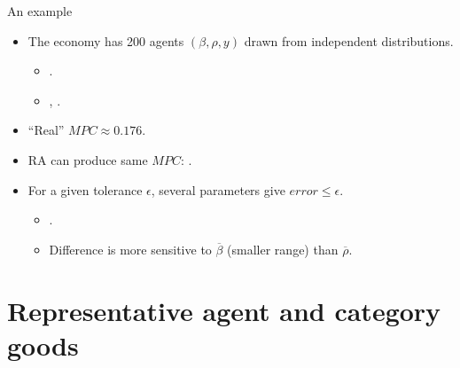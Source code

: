 \documentclass[10pt, handout]{beamer}
\begin{document}
\begin{frame}[label=Carroll-Example]{An example}
	\vfill
	\begin{itemize}
		\item The economy has 200 agents $(\beta,\rho,y)$ drawn from independent distributions.\vspace{1ex}
			\begin{itemize}
				\item \hyperlink{Carroll-Construction}{}.\vspace{1ex}
				\item \hyperlink{Carroll-JointBetaRho}{}, \hyperlink{Carroll-JointAll}{}.
			\end{itemize} \vfill

		\item ``Real'' $MPC \approx 0.176$. \vfill
		
		\item RA can produce same $MPC$: \hyperlink{Carroll-MPCgrid}{}. \vfill
		
		\item For a given tolerance $\epsilon$, several parameters give $error \leq \epsilon$.\vspace{1ex}
			\begin{itemize}
				\item \hyperlink{Carroll-ZeroDiff}{}.
				\item Difference is more sensitive to $\overline{\beta}$ (smaller range) than $\overline{\rho}$.
			\end{itemize}
 
	\end{itemize} \vfill

\end{frame}


\section{Representative agent and category goods}

\begin{frame}
	\tableofcontents[currentsection]
\end{frame}
\end{document}
